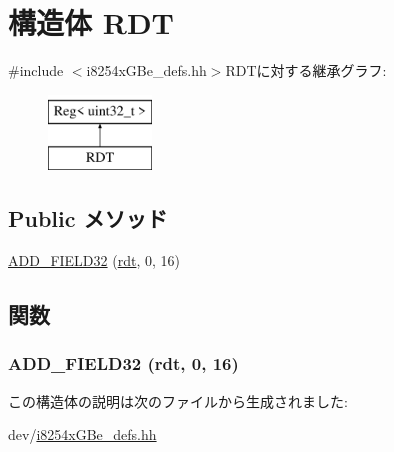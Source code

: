 \hypertarget{structiGbReg_1_1Regs_1_1RDT}{
\section{構造体 RDT}
\label{structiGbReg_1_1Regs_1_1RDT}
}


{\ttfamily \#include $<$i8254xGBe\_\-defs.hh$>$}RDTに対する継承グラフ:\begin{figure}[H]
\begin{center}
\leavevmode
\includegraphics[height=2cm]{structiGbReg_1_1Regs_1_1RDT}
\end{center}
\end{figure}
\subsection*{Public メソッド}
\begin{DoxyCompactItemize}
\item 
\hyperlink{structiGbReg_1_1Regs_1_1RDT_a01525df153de10f40c17ae5e180cda4f}{ADD\_\-FIELD32} (\hyperlink{structiGbReg_1_1Regs_a7518b9a796cfdbb12e4ad473349ffb80}{rdt}, 0, 16)
\end{DoxyCompactItemize}


\subsection{関数}
\hypertarget{structiGbReg_1_1Regs_1_1RDT_a01525df153de10f40c17ae5e180cda4f}{
\subsubsection[{ADD\_\-FIELD32}]{\setlength{\rightskip}{0pt plus 5cm}ADD\_\-FIELD32 ({\bf rdt}, \/  0, \/  16)}}
\label{structiGbReg_1_1Regs_1_1RDT_a01525df153de10f40c17ae5e180cda4f}


この構造体の説明は次のファイルから生成されました:\begin{DoxyCompactItemize}
\item 
dev/\hyperlink{i8254xGBe__defs_8hh}{i8254xGBe\_\-defs.hh}\end{DoxyCompactItemize}
